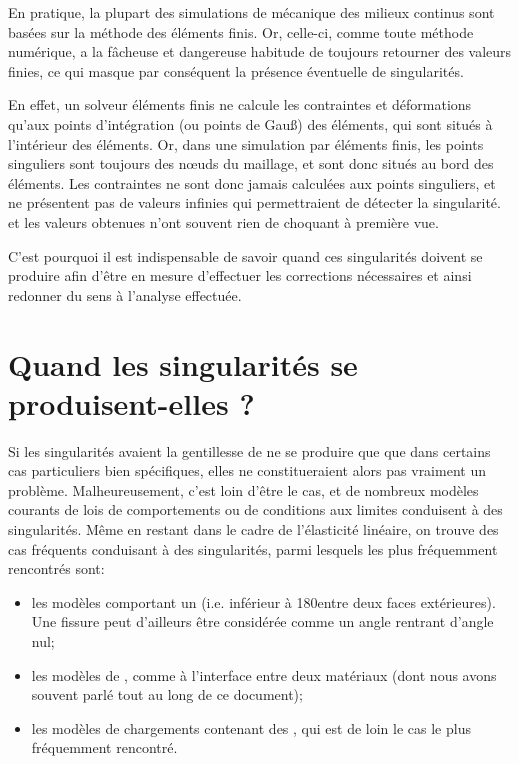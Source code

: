 En pratique, la plupart des simulations de mécanique des milieux continus sont basées sur la méthode des éléments finis. Or, celle-ci, comme toute méthode numérique, a la fâcheuse et dangereuse habitude de toujours retourner des valeurs finies, ce qui masque par conséquent la présence éventuelle de singularités.

\medskip
En effet, un solveur éléments finis ne calcule les contraintes et déformations qu'aux points d'intégration (ou points de Gauß) des éléments, qui sont situés à l'intérieur des éléments. Or, dans une simulation par éléments finis, les points singuliers sont toujours des nœuds du maillage, et sont donc situés au bord des éléments. Les contraintes ne sont donc jamais calculées aux points singuliers, et ne présentent pas de valeurs infinies qui permettraient de détecter la singularité.  et les valeurs obtenues n'ont souvent rien de choquant à première vue.

C'est pourquoi il est indispensable de savoir quand ces singularités doivent se produire afin d'être en mesure d'effectuer les corrections nécessaires et ainsi redonner du sens à l'analyse effectuée.


\medskip
\section{Quand les singularités se produisent-elles ?}

Si les singularités avaient la gentillesse de ne se produire que que dans certains cas particuliers bien spécifiques, elles ne constitueraient alors pas vraiment un problème. Malheureusement, c'est loin d'être le cas, et de nombreux modèles courants de lois de comportements ou de conditions aux limites conduisent à des singularités. Même en restant dans le cadre de l'élasticité linéaire, on trouve des cas fréquents conduisant à des singularités, parmi lesquels les plus fréquemment rencontrés sont:
\medskip
\begin{itemize}
  \item les modèles comportant un  (i.e. inférieur à 	180\degre entre deux faces extérieures). Une fissure peut d'ailleurs être considérée 	comme un angle rentrant d'angle nul;
  \item les modèles de , comme à 	l'interface entre deux matériaux (dont nous avons souvent parlé tout au long de ce 	document);
  \item les modèles de chargements contenant des , qui est de loin le cas le plus fréquemment rencontré.
\end{itemize}

